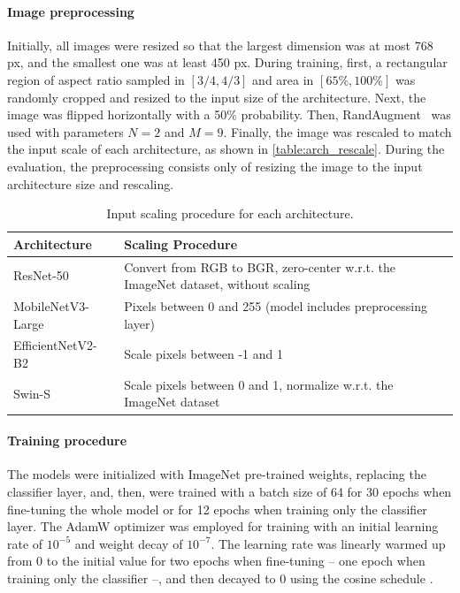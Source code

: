 \paragraph{\textbf{Image preprocessing}} Initially, all images were resized so
that the largest dimension was at most 768 px, and the smallest one was at
least 450 px. During training, first, a rectangular region of aspect ratio
sampled in $[3/4, 4/3]$ and area in $[65\%, 100\%]$ was randomly cropped and
resized to the input size of the architecture. Next, the image was flipped
horizontally with a 50\% probability. Then,
RandAugment~\citep{cubuk2020randaugment} was used with parameters $N=2$ and
$M=9$. Finally, the image was rescaled to match the input scale of each
architecture, as shown in \autoref{table:arch_rescale}. During the evaluation,
the preprocessing consists only of resizing the image to the input architecture
size and rescaling.

\begin{table}[htb]
\caption{Input scaling procedure for each architecture.}
\label{table:arch_rescale}
\begin{center}
\begin{tabular}{lp{}}
\hline
Architecture & Scaling Procedure
                     \\ \hline
ResNet-50   & Convert from RGB to BGR, zero-center w.r.t. the ImageNet
dataset, without scaling \\
MobileNetV3-Large  & Pixels between 0 and 255 (model includes preprocessing
layer)                     \\
EfficientNetV2-B2 & Scale pixels between -1 and 1
                      \\
Swin-S  & Scale pixels between 0 and 1, normalize w.r.t. the ImageNet
dataset               \\ \hline
\end{tabular}
\end{center}
\end{table}

\paragraph{\textbf{Training procedure}} The models were initialized with
ImageNet pre-trained weights, replacing the classifier layer, and, then, were
trained with a batch size of 64 for 30 epochs when fine-tuning the whole model
or for 12 epochs when training only the classifier layer. The AdamW optimizer
\citep{loshchilov2018decoupled} was employed for training with an initial
learning rate of $10^{-5}$ and weight decay of $10^{-7}$. The learning rate was
linearly warmed up from $0$ to the initial value for two epochs when fine-tuning
-- one epoch when training only the classifier --, and then decayed to $0$
using the cosine schedule \citep{he2019bag}.

